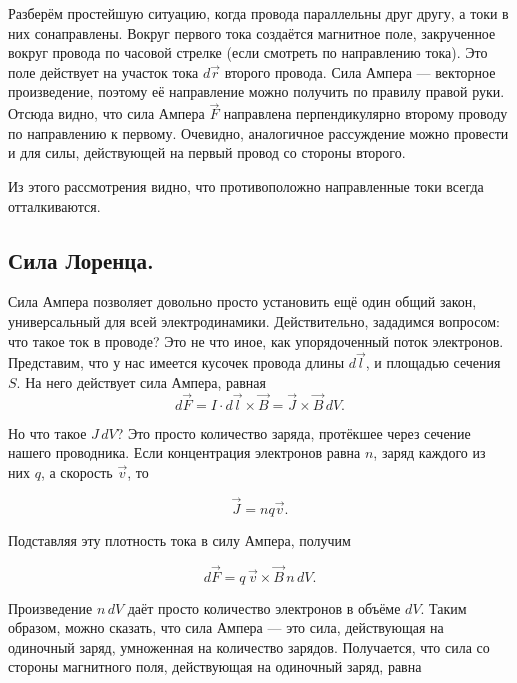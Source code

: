 \documentclass[11pt,a4paper]{article}
\numberwithin{equation}{section}
\begin{document}
Разберём простейшую ситуацию, когда провода параллельны друг другу, а
токи в них сонаправлены. Вокруг первого тока создаётся магнитное поле,
закрученное вокруг провода по часовой стрелке (если смотреть по
направлению тока). Это поле действует на участок тока $d\vec{r}$
второго провода. Сила Ампера --- векторное произведение, поэтому её
направление можно получить по правилу правой руки. Отсюда видно, что
сила Ампера $\vec{F}$ направлена перпендикулярно второму проводу по
направлению к первому. Очевидно, аналогичное рассуждение можно
провести и для силы, действующей на первый провод со стороны второго.

Из этого рассмотрения видно, что противоположно направленные токи
всегда отталкиваются. 

\subsection{Сила Лоренца.}
\label{sec:lorentz_force}

Сила Ампера позволяет довольно просто установить ещё один общий закон,
универсальный для всей электродинамики. Действительно, зададимся
вопросом: что такое ток в проводе? Это не что иное, как упорядоченный
поток электронов. Представим, что у нас имеется кусочек провода длины
$d\vec{l}$, и площадью сечения $S$. На него действует сила Ампера,
равная
\begin{equation}
  \label{eq:der_lorentz_force_1}
  d\vec{F} = I \cdot d\vec{l} \times \vec{B} = \vec{J} \times \vec{B}\, dV.
\end{equation}

Но что такое $J \, dV$? Это просто количество заряда, протёкшее через
сечение нашего проводника. Если концентрация электронов равна $n$, заряд
каждого из них $q$, а скорость $\vec{v}$, то 

\begin{equation}
  \label{eq:der_lorentz_force_2}
  \vec{J} = n q \vec{v}.
\end{equation}

Подставляя эту плотность тока в силу Ампера, получим

\begin{equation}
  \label{eq:der_lorentz_force_3}
  d\vec{F} = q \, \vec{v} \times \vec{B} \, n\, dV.
\end{equation}

Произведение $n \, dV$ даёт просто количество электронов в объёме
$dV$. Таким образом, можно сказать, что сила Ампера --- это сила,
действующая на одиночный заряд, умноженная на количество
зарядов. Получается, что сила со стороны магнитного поля, действующая
на одиночный заряд, равна
\end{document}
